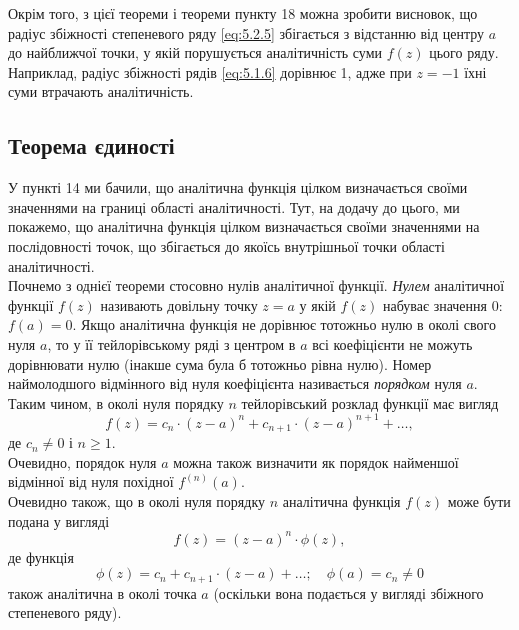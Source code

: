 Окрім того, з цієї теореми і теореми пункту 18 можна зробити висновок, що радіус збіжності степеневого ряду \eqref{eq:5.2.5} %
збігається з відстанню від центру $a$ до найближчої точки, у якій порушується аналітичність суми $f(z)$ цього ряду. Наприклад, радіус збіжності рядів \eqref{eq:5.1.6} %
дорівнює 1, адже при $z = -1$ їхні суми втрачають аналітичність.

\subsection{Теорема єдиності}

У пункті 14 ми бачили, що аналітична функція цілком визначається своїми значеннями на границі області аналітичності. Тут, на додачу до цього, ми покажемо, що аналітична функція цілком визначається своїми значеннями на послідовності точок, що збігається до якоїсь внутрішньої точки області аналітичності. \\

Почнемо з однієї теореми стосовно нулів аналітичної функції. \textit{Нулем} аналітичної функції $f(z)$ називають довільну точку $z = a$ у якій $f(z)$ набуває значення 0: $f(a) = 0$. Якщо аналітична функція не дорівнює тотожньо нулю в околі свого нуля $a$, то у її тейлорівському ряді з центром в $a$ всі коефіцієнти не можуть дорівнювати нулю (інакше сума була б тотожньо рівна нулю). Номер наймолодшого відмінного від нуля коефіцієнта називається \textit{порядком} нуля $a$. Таким чином, в околі нуля порядку $n$ тейлорівський розклад функції має вигляд
\begin{equation}
	\label{eq:5.3.1}
	f(z) = c_n \cdot (z - a)^n + c_{n + 1} \cdot (z - a)^{n + 1} + \ldots,
\end{equation}
де $c_n \ne 0$ і $n \ge 1$. \\

Очевидно, порядок нуля $a$ можна також визначити як порядок найменшої відмінної від нуля похідної $f^{(n)}(a)$. \\

Очевидно також, що в околі нуля порядку $n$ аналітична функція $f(z)$ може бути подана у вигляді
\begin{equation}
	\label{eq:5.3.2}
	f(z) = (z - a)^n \cdot \phi(z),
\end{equation}
де функція
\begin{equation}
	\label{eq:5.3.3}
	\phi(z) = c_n + c_{n + 1} \cdot (z - a) + \ldots; \quad \phi(a) = c_n \ne 0
\end{equation}
також аналітична в околі точка $a$ (оскільки вона подається у вигляді збіжного степеневого ряду). \\

